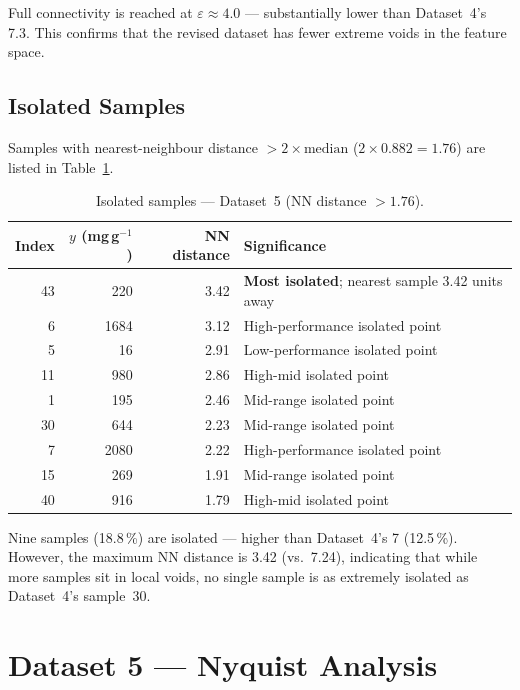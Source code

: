 \documentclass[12pt,a4paper]{article}
\begin{document}
Full connectivity is reached at $\varepsilon \approx 4.0$ — substantially
lower than Dataset~4's 7.3.  This confirms that the revised dataset has
fewer extreme voids in the feature space.

\subsection{Isolated Samples}

Samples with nearest-neighbour distance $> 2 \times \text{median}$
($2 \times 0.882 = 1.76$) are listed in Table~\ref{tab:ds5_isolated}.

\begin{table}[h]
\centering
\caption{Isolated samples — Dataset~5 (NN distance $> 1.76$).}
\label{tab:ds5_isolated}
\begin{tabular}{rrrp{7cm}}
\toprule
Index & $y$ (mg\,g$^{-1}$) & NN distance & Significance \\
\midrule
43 & 220  & 3.42 & \textbf{Most isolated}; nearest sample 3.42 units away \\
 6 & 1684 & 3.12 & High-performance isolated point \\
 5 & 16   & 2.91 & Low-performance isolated point \\
11 & 980  & 2.86 & High-mid isolated point \\
 1 & 195  & 2.46 & Mid-range isolated point \\
30 & 644  & 2.23 & Mid-range isolated point \\
 7 & 2080 & 2.22 & High-performance isolated point \\
15 & 269  & 1.91 & Mid-range isolated point \\
40 & 916  & 1.79 & High-mid isolated point \\
\bottomrule
\end{tabular}
\end{table}

Nine samples (18.8\,\%) are isolated — higher than Dataset~4's 7 (12.5\,\%).
However, the maximum NN distance is 3.42 (vs.\ 7.24), indicating that
while more samples sit in local voids, no single sample is as extremely
isolated as Dataset~4's sample~30.

\section{Dataset 5 — Nyquist Analysis}
\label{sec:ds5_nyquist}
\end{document}
